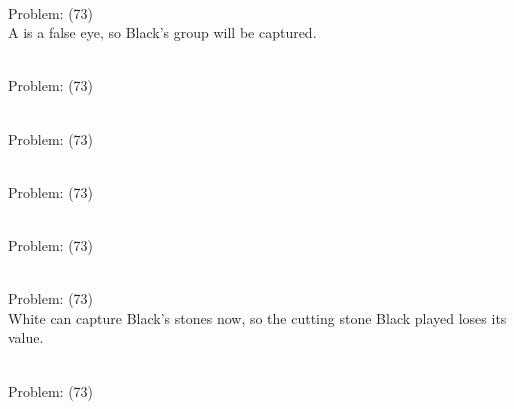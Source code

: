 \documentclass[11pt]{article}
\begin{document}
\begin{minipage}[t]{0.5\textwidth}
  {\centering
  
\\
Problem: (73)\\
A is a false eye, so Black's group will be captured.\\
  }
\end{minipage}
\begin{minipage}[t]{0.5\textwidth}
  {\centering
  
\\
Problem: (73)\\
  }
\end{minipage}
\begin{minipage}[t]{0.5\textwidth}
  {\centering
  
\\
Problem: (73)\\
  }
\end{minipage}
\begin{minipage}[t]{0.5\textwidth}
  {\centering
  
\\
Problem: (73)\\
  }
\end{minipage}
\begin{minipage}[t]{0.5\textwidth}
  {\centering
  
\\
Problem: (73)\\
  }
\end{minipage}
\begin{minipage}[t]{0.5\textwidth}
  {\centering
  
\\
Problem: (73)\\
White can capture Black's stones now, so the cutting stone Black played loses its value.\\
  }
\end{minipage}
\begin{minipage}[t]{0.5\textwidth}
  {\centering
  
\\
Problem: (73)\\
  }
\end{minipage}
\end{document}
